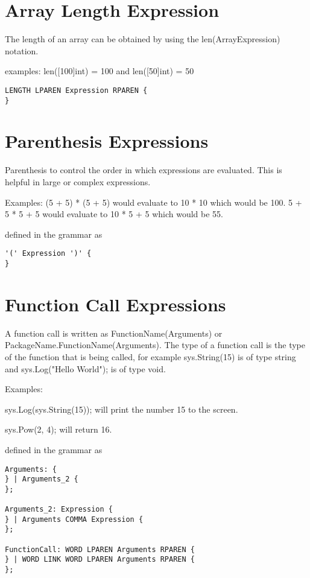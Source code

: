 \documentclass[]{final_report}
\begin{document}
\section{Array Length Expression}

The length of an array can be obtained by using the len(ArrayExpression) notation.

examples:
len([100]int) = 100 and len([50]int) = 50

\begin{verbatim}LENGTH LPAREN Expression RPAREN {
}
\end{verbatim}

\section{Parenthesis Expressions}

Parenthesis to control the order in which expressions are evaluated. This is helpful in large or complex expressions.

Examples: (5 + 5) * (5 + 5) would evaluate to 10 * 10 which would be 100. 5 + 5 * 5 + 5 would evaluate to 10 * 5 + 5 which would be 55.

defined in the grammar as
\begin{verbatim}
'(' Expression ')' {
}
\end{verbatim}

\section{Function Call Expressions}

A function call is written as FunctionName(Arguments) or PackageName.FunctionName(Arguments). The type of a function call is the type of the function that is being called, for example sys.String(15) is of type string and sys.Log("Hello World"); is of type void.

Examples:

sys.Log(sys.String(15)); will print the number 15 to the screen.

sys.Pow(2, 4); will return 16.

defined in the grammar as
\begin{verbatim}
Arguments: {
} | Arguments_2 {
};

Arguments_2: Expression {
} | Arguments COMMA Expression {
};

FunctionCall: WORD LPAREN Arguments RPAREN {
} | WORD LINK WORD LPAREN Arguments RPAREN {
};
\end{verbatim}
\end{document}
